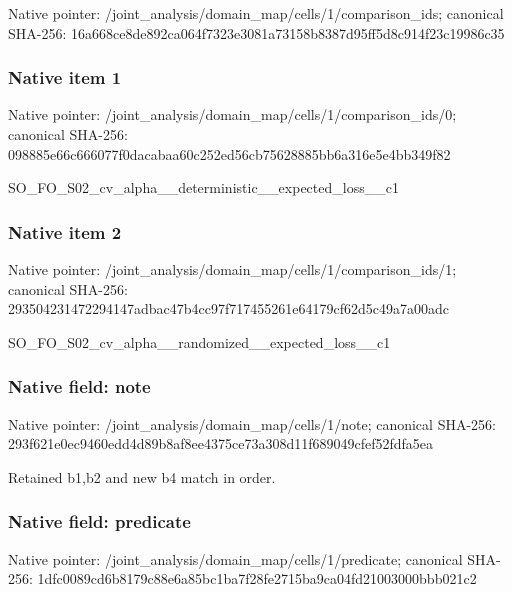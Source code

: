 \documentclass[10pt,a4paper]{article}
\begin{document}
Native pointer: /joint\_analysis/domain\_m\allowbreak{}ap/cells/1/comparison\_id\allowbreak{}s; canonical SHA-256: 16a668ce8de892ca064f7323\allowbreak{}e3081a73158b8387d95ff5d8\allowbreak{}c914f23c19986c35



\subsubsection{Native item 1}


Native pointer: /joint\_analysis/domain\_m\allowbreak{}ap/cells/1/comparison\_id\allowbreak{}s/0; canonical SHA-256: 098885e66c666077f0dacaba\allowbreak{}a60c252ed56cb75628885bb6\allowbreak{}a316e5e4bb349f82


SO\_FO\_S02\_cv\_alpha\_\_dete\allowbreak{}rministic\_\_expected\_loss\allowbreak{}\_\_c1


\subsubsection{Native item 2}


Native pointer: /joint\_analysis/domain\_m\allowbreak{}ap/cells/1/comparison\_id\allowbreak{}s/1; canonical SHA-256: 293504231472294147adbac4\allowbreak{}7b4cc97f717455261e64179c\allowbreak{}f62d5c49a7a00adc


SO\_FO\_S02\_cv\_alpha\_\_rand\allowbreak{}omized\_\_expected\_loss\_\_c\allowbreak{}1


\subsubsection{Native field: note}


Native pointer: /joint\_analysis/domain\_map/cells/1/note; canonical SHA-256: 293f621e0ec9460edd4d89b8\allowbreak{}af8ee4375ce73a308d11f689\allowbreak{}049cfef52fdfa5ea


Retained b1,b2 and new b4 match in order.


\subsubsection{Native field: predicate}


Native pointer: /joint\_analysis/domain\_m\allowbreak{}ap/cells/1/predicate; canonical SHA-256: 1dfc0089cd6b8179c88e6a85\allowbreak{}bc1ba7f28fe2715ba9ca04fd\allowbreak{}21003000bbb021c2
\end{document}
